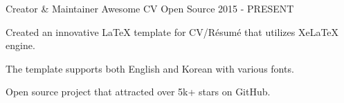 

\begin{cventries}

\cventry
{Creator \& Maintainer} %
{Awesome CV} %
{Open Source} %
{2015 - PRESENT} %
{
  \begin{cvitems} %
    \item {Created an innovative LaTeX template for CV/Résumé that utilizes XeLaTeX engine.}
    \item {The template supports both English and Korean with various fonts.}
    \item {Open source project that attracted over 5k+ stars on GitHub.}
  \end{cvitems}
}

\end{cventries} 
